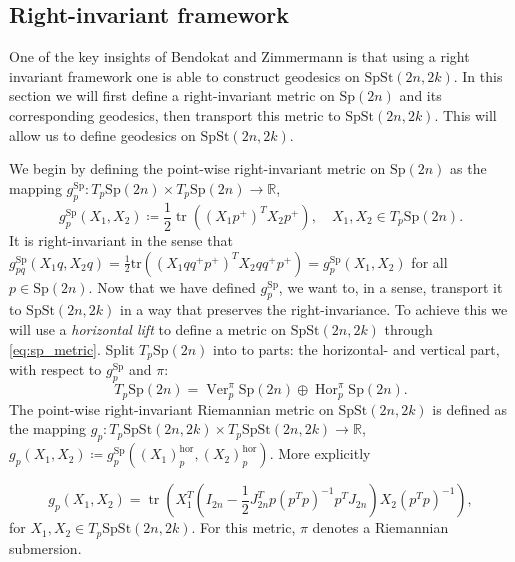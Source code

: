 \subsection{Right-invariant framework}
One of the key insights of Bendokat and Zimmermann \cite[p.~11]{BendokatZimmermann2021} is that using a right invariant framework one is able to construct geodesics on $\mathrm{SpSt}(2n, 2k)$. In this section we will first define a right-invariant metric on $\mathrm{Sp}(2n)$ and its corresponding geodesics, then transport this metric to $\mathrm{SpSt}(2n, 2k)$. This will allow us to define geodesics on $\mathrm{SpSt}(2n, 2k)$. 

We begin by defining the point-wise right-invariant metric on $\mathrm{Sp}(2n)$ as the mapping $g_{p}^{\mathrm{Sp}}:T_{p}\mathrm{Sp}(2n)\times T_{p}\mathrm{Sp}(2n)\xrightarrow{}\mathbb{R}$, 
\begin{equation}\label{eq:sp_metric}
    g_{p}^{\mathrm{Sp}}(X_{1},X_{2})\coloneqq\frac{1}{2}\operatorname{tr}((X_{1}p^{+})^{T}X_{2}p^{+}),\quad X_{1},X_{2}\in T_{p}\mathrm{Sp}(2n).
\end{equation}
It is right-invariant in the sense that
$g_{pq}^{\mathrm{Sp}}(X_{1}q,X_{2}q)=\tfrac{1}{2}\mathrm{tr}((X_{1}qq^{+}p^{+})^{T}X_{2}qq^{+}p^{+})=g_{p}^{\mathrm{Sp}}(X_{1},X_{2})$ for all $p\in \mathrm{Sp}(2n)$.
Now that we have defined $g_{p}^{\mathrm{Sp}}$, we want to, in a sense, transport it to $\mathrm{SpSt}(2n, 2k)$ in a way that preserves the right-invariance. To achieve this we will use a \textit{horizontal lift} to define a metric on $\mathrm{SpSt}(2n, 2k)$ through \ref{eq:sp_metric}. Split $T_{p}\mathrm{Sp}(2n)$ into to parts: the horizontal- and vertical part, with respect to $g^\mathrm{Sp}_{p}$ and $\pi$: %
\begin{equation}\label{eq:spst_split}
    T_{p}\mathrm{Sp}(2n)=\operatorname{Ver}^{\pi}_{p}\mathrm{Sp}(2n)\oplus \operatorname{Hor}^{\pi}_{p}\mathrm{Sp}(2n).
\end{equation}
The point-wise right-invariant Riemannian metric on $\mathrm{SpSt}(2n, 2k)$ is defined as the mapping $g_{p}:T_{p}\mathrm{SpSt}(2n, 2k)\times T_{p}\mathrm{SpSt}(2n, 2k)\xrightarrow{}\mathbb{R}$, $g_{p}(X_{1},X_{2})\coloneqq g^{\mathrm{Sp}}_{p}((X_{1})^{\mathrm{hor}}_{p},(X_{2})^{\mathrm{hor}}_{p})$. More explicitly


\begin{equation}\label{eq:spst_metric}
    g_{p}(X_{1},X_{2})=\operatorname{tr}\left(X_{1}^{T}\left(I_{2n}- \frac{1}{2}J_{2n}^{T}p(p^{T}p)^{-1}p^{T}J_{2n}\right)X_{2}(p^{T}p)^{-1}\right),
\end{equation}
for $X_{1},X_{2}\in T_{p}\mathrm{SpSt}(2n, 2k)$. For this metric, $\pi$ denotes a Riemannian submersion.


